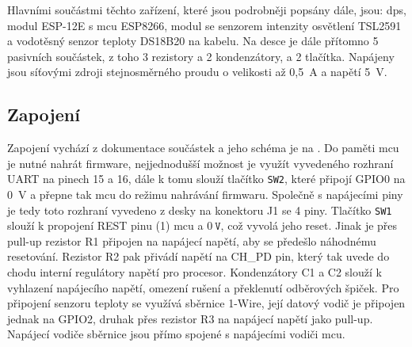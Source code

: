     Hlavními součástmi těchto zařízení, které jsou podrobněji popsány dále, jsou: \acrshort{dps}, modul ESP-12E s \acrshort{mcu} ESP8266, modul se senzorem intenzity osvětlení TSL2591 a vodotěsný senzor teploty DS18B20 na kabelu. Na desce je dále přítomno 5 pasivních součástek, z toho 3 rezistory a 2 kondenzátory, a 2 tlačítka. Napájeny jsou síťovými zdroji stejnosměrného proudu o velikosti až 0{,}5~A a napětí 5~V.
    \subsection{Zapojení}
    Zapojení vychází z dokumentace součástek a jeho schéma je na . Do paměti \acrshort{mcu} je nutné nahrát firmware, nejjednodušší možnost je využít vyvedeného rozhraní UART na pinech 15 a 16, dále k tomu slouží tlačítko \texttt{SW2}, které připojí GPIO0 na 0~V a přepne tak \acrshort{mcu} do režimu nahrávání firmwaru. Společně s napájecími piny je tedy toto rozhraní vyvedeno z desky na konektoru J1 se 4 piny. Tlačítko \texttt{SW1} slouží k propojení REST pinu (1) \acrshort{mcu} a $0~\texttt{V}$, což vyvolá jeho reset. Jinak je přes pull-up rezistor R1 připojen na napájecí napětí, aby se předešlo náhodnému resetování. Rezistor R2 pak přivádí napětí na CH\_PD pin, který tak uvede do chodu interní regulátory napětí pro procesor. Kondenzátory C1 a C2 slouží k vyhlazení napájecího napětí, omezení rušení a překlenutí odběrových špiček. Pro připojení senzoru teploty se využívá sběrnice 1-Wire, její datový vodič je připojen jednak na GPIO2, druhak přes rezistor R3 na napájecí napětí jako pull-up. Napájecí vodiče sběrnice jsou přímo spojené s napájecími vodiči \acrshort{mcu}.

